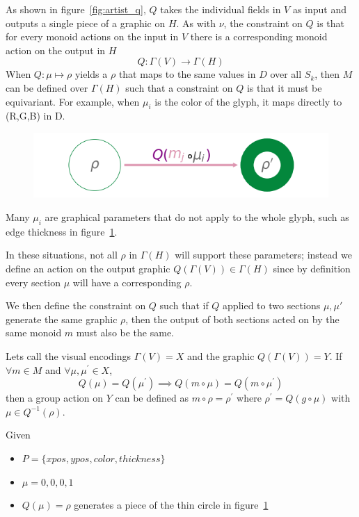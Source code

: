 \documentclass[../main.tex]{subfiles}
\begin{document}
As shown in figure~\ref{fig:artist_q}, $Q$ takes the individual fields in $V$ as input and outputs a single piece of a graphic on $H$. As with $\nu$, the constraint on $Q$ is that for every monoid actions on the input in $V$ there is a corresponding monoid action on the output in $H$
\begin{equation}
    Q: \Gamma(V) \rightarrow \Gamma(H)
\end{equation}
When $Q: \mu \mapsto \rho$ yields a $\rho$ that maps to the same values in $D$ over all $S_k$, then $M$ can be defined over $\Gamma(H)$ such that a constraint on $Q$ is that it must be equivariant. For example, when $\mu_{i}$ is the color of the glyph, it maps directly to (R,G,B) in D.

\begin{figure}[H]
    \includegraphics[width=\textwidth]{figures/math/diff_type_q.png}
    \label{fig:artist_mark_change}
\end{figure}

Many $\mu_{i}$ are graphical parameters that do not apply to the whole glyph, such as edge thickness in figure~\ref{fig:artist_mark_change}. 

In these situations, not all  $\rho$ in $\Gamma(H)$ will support these parameters; instead we define an action on the output graphic $Q(\Gamma(V)) \in \Gamma(H)$ since by definition every section $\mu$ will have a corresponding $\rho$.

We then define the constraint on $Q$ such that if $Q$ applied to two sections $\mu, \mu\prime$ generate the same graphic $\rho$, then the output of both sections acted on by the same monoid $m$ must also be the same.    

Lets call the visual encodings $\Gamma(V)=X$ and the graphic $Q(\Gamma(V))=Y$. If $\forall m \in M$ and $\forall \mu, \mu^\prime \in X$, 
\begin{equation}
Q(\mu) = Q(\mu^\prime)\implies Q(m\circ\mu) = Q(m\circ\mu^\prime)
\end{equation}
then a group action on $Y$ can be defined as $m\circ \rho = \rho^\prime$ where $\rho^\prime=Q(g\circ \mu)$ with $\mu \in Q^{-1}(\rho)$. 

Given  
\begin{itemize}
    \item $P = \{xpos, ypos, color, thickness\}$
    \item $\mu = {0,0,0, 1}$
    \item  $Q(\mu)=\rho$ generates a piece of the thin circle in figure~\ref{fig:artist_mark_change}
\end{itemize}
\end{document}
